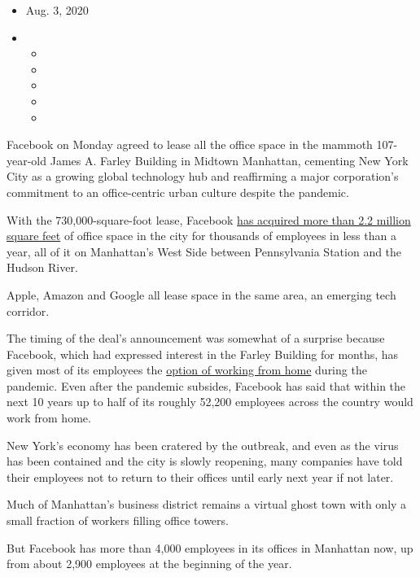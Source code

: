 \begin{itemize}
\item
  Aug. 3, 2020
\item
  \begin{itemize}
  \item
  \item
  \item
  \item
  \item
  \end{itemize}
\end{itemize}

Facebook on Monday agreed to lease all the office space in the mammoth
107-year-old James A. Farley Building in Midtown Manhattan, cementing
New York City as a growing global technology hub and reaffirming a major
corporation's commitment to an office-centric urban culture despite the
pandemic.

With the 730,000-square-foot lease, Facebook
\href{https://www.nytimes3xbfgragh.onion/2020/01/05/nyregion/nyc-tech-facebook-amazon-google.html}{has
acquired more than 2.2 million square feet} of office space in the city
for thousands of employees in less than a year, all of it on Manhattan's
West Side between Pennsylvania Station and the Hudson River.

Apple, Amazon and Google all lease space in the same area, an emerging
tech corridor.

The timing of the deal's announcement was somewhat of a surprise because
Facebook, which had expressed interest in the Farley Building for
months, has given most of its employees the
\href{https://www.nytimes3xbfgragh.onion/2020/05/21/technology/facebook-remote-work-coronavirus.html}{option
of working from home} during the pandemic. Even after the pandemic
subsides, Facebook has said that within the next 10 years up to half of
its roughly 52,200 employees across the country would work from home.

New York's economy has been cratered by the outbreak, and even as the
virus has been contained and the city is slowly reopening, many
companies have told their employees not to return to their offices until
early next year if not later.

Much of Manhattan's business district remains a virtual ghost town with
only a small fraction of workers filling office towers.

But Facebook has more than 4,000 employees in its offices in Manhattan
now, up from about 2,900 employees at the beginning of the year.


